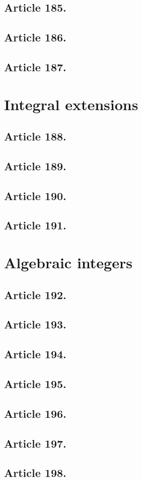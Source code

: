 \subsection{Article 185.}

\subsection{Article 186.}

\subsection{Article 187.}


\section{Integral extensions}


\subsection{Article 188.}

\subsection{Article 189.}

\subsection{Article 190.}

\subsection{Article 191.}


\section{Algebraic integers}


\subsection{Article 192.}

\subsection{Article 193.}

\subsection{Article 194.}

\subsection{Article 195.}

\subsection{Article 196.}

\subsection{Article 197.}

\subsection{Article 198.}

